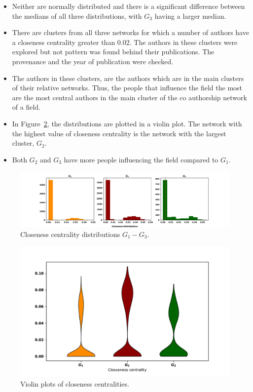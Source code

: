 \documentclass{article}
\theoremstyle{definition}
\begin{document}
\begin{itemize}
    \item  Neither are normally distributed and there is a significant difference
    between the medians of all three distributions, with \(G_3\) having a larger median.
    \item There are clusters from all three networks for which a number of authors
    have a closeness centrality greater than 0.02. The authors in these clusters
    were explored but not pattern was found behind their publications. The
    provenance and the year of publication were checked.
    \item The authors in these clusters, are the authors which are in the main
    clusters of their relative networks. Thus, the people that influence the
    field the most are the most central authors in the main cluster of the
    co authorship network of a field.
    \item In Figure~\ref{fig:violin_closeness}, the distributions are plotted in
    a violin plot. The network with the highest value of closeness centrality
    is the network with the largest cluster, \(G_2\).
    \item Both \(G_2\) and \(G_3\) have more people influencing the field compared
    to \(G_1\).
\end{itemize}

\begin{figure}[!hbtp]
    \centering
    \includegraphics[width=\textwidth]{./assets/images/closeness_distributions.pdf}
    \caption{Closeness centrality distributions  \(G_1- G_3\).}\label{fig:closeness_dist}
\end{figure}

\begin{figure}[!hbtp]
    \centering
    \includegraphics[width=.7\textwidth]{./assets/images/closeness_violins.pdf}
    \caption{Violin plots of closeness centralities.}\label{fig:violin_closeness}
\end{figure}
\end{document}
